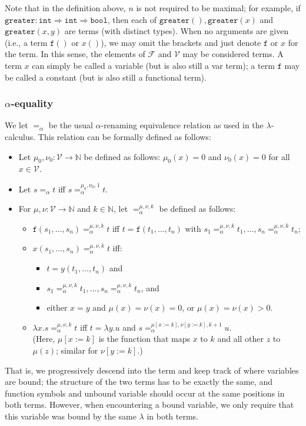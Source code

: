 \documentclass{lmcs}
\theoremstyle{theorem}\newtheorem{theorem}{Theorem}
\theoremstyle{theorem}\newtheorem{lemma}[theorem]{Lemma}
\theoremstyle{theorem}\newtheorem{corollary}[theorem]{Corollary}
\theoremstyle{definition}\newtheorem{definition}[theorem]{Definition}
\theoremstyle{definition}\newtheorem{example}[theorem]{Example}
\newcommand{\N}{\mathbb{N}}
\newcommand{\F}{\mathcal{F}}
\newcommand{\V}{\mathcal{V}}
\newcommand{\identifier}[1]{\mathtt{#1}}
\newcommand{\afun}{\identifier{f}}
\newcommand{\avar}{x}
\newcommand{\bvar}{y}
\newcommand{\cvar}{z}
\newcommand{\abs}[2]{\lambda #1.#2}
\newcommand{\arrtype}{\Rightarrow}
\newcommand{\symb}[1]{\mathtt{#1}}
\newcommand{\mysubsection}[1]{\vspace{-12pt}\subsubsection{#1}}
\begin{document}
Note that in the definition above, $n$ is not required to be maximal; for example, if
$\symb{greater} : \mathtt{int} \arrtype \mathtt{int} \arrtype \mathtt{bool}$, then each of
$\symb{greater}(),\symb{greater}(\avar)$ and $\symb{greater}(\avar,\bvar)$ are terms (with
distinct types). When no arguments are given (i.e., a term $\afun()$ or $\avar()$), we may omit
the brackets and just denote $\afun$ or $\avar$ for the term.  In this sense, the elements of $\F$
and $\V$ may be considered terms.
A term $\avar$ can simply be called a variable (but is also still a var term);
a term $\afun$ may be called a constant (but is also still a functional term).

\mysubsection{$\alpha$-equality}
We let $=_\alpha$ be the usual $\alpha$-renaming equivalence relation as used in the
$\lambda$-calculus. This relation can be formally defined as follows:
\begin{itemize}
\item Let $\mu_0,\nu_0 : \V \rightarrow \N$ be defined as follows:
  $\mu_0(\avar) = 0$ and $\nu_0(\avar) = 0$ for all $\avar \in \V$.
\item Let $s =_\alpha t$ iff $s =_\alpha^{\mu_0,\nu_0,1} t$.
\item For $\mu,\nu : \V \rightarrow \N$ and $k \in \N$, let $=_\alpha^{\mu,\nu,k}$ be defined as
  follows:
  \begin{itemize}
  \item $\afun(s_1,\dots,s_n) =_\alpha^{\mu,\nu,k} t$ iff $t = \afun(t_1,\dots,t_n)$ with $s_1
    =_\alpha^{\mu,\nu,k} t_1,\dots,s_n =_\alpha^{\mu,\nu,k} t_n$;
  \item $\avar(s_1,\dots,s_n) =_\alpha^{\mu,\nu,k} t$ iff:
    \begin{itemize}
    \item $t = \bvar(t_1,\dots,t_n)$ and
    \item $s_1 =_\alpha^{\mu,\nu,k} t_1,\dots,s_n =_\alpha^{\mu,\nu,k} t_n$, and
    \item either $\avar = \bvar$ and $\mu(\avar) = \nu(\avar) = 0$,
      or $\mu(\avar) = \nu(\avar) > 0$.
    \end{itemize}
  \item $\abs{\avar}{s} =_\alpha^{\mu,\nu,k} t$ iff
    $t = \abs{\bvar}{u}$ and $s =_\alpha^{\mu[\avar:=k],\nu[\bvar:=k],k+1} u$. \\
    (Here, $\mu[\avar:=k]$ is the function that maps $\avar$ to $k$ and all other $\cvar$ to
    $\mu(\cvar)$; similar for $\nu[\bvar:=k]$.)
  \end{itemize}
\end{itemize}
That is, we progressively descend into the term and keep track of where variables are bound; the
structure of the two terms has to be exactly the same, and function symbols and unbound variable
should occur at the same positions in both terms. However, when encountering a bound variable, we
only require that this variable was bound by the same $\lambda$ in both terms.
\end{document}
